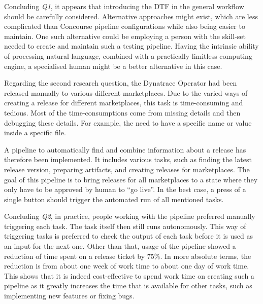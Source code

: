 Concluding \textit{Q1}, it appears that introducing the DTF in the general workflow should be carefully considered.
Alternative approaches might exist, which are less complicated than Concourse pipeline configurations while also being easier to maintain.
One such alternative could be employing a person with the skill-set needed to create and maintain such a testing pipeline.
Having the intrinsic ability of processing natural language, combined with a practically limitless computing engine, a specialised human might be a better alternative in this case.

Regarding the second research question, the Dynatrace Operator had been released manually to various different marketplaces.
Due to the varied ways of creating a release for different marketplaces, this task is time-consuming and tedious.
Most of the time-consumptions come from missing details and then debugging these details.
For example, the need to have a specific name or value inside a specific file.

A pipeline to automatically find and combine information about a release has therefore been implemented.
It includes various tasks, such as finding the latest release version, preparing artifacts, and creating releases for marketplaces.
The goal of this pipeline is to bring releases for all marketplaces to a state where they only have to be approved by human to ``go live''.
In the best case, a press of a single button should trigger the automated run of all mentioned tasks.

Concluding \textit{Q2}, in practice, people working with the pipeline preferred manually triggering each task.
The task itself then still runs autonomously.
This way of triggering tasks is preferred to check the output of each task before it is used as an input for the next one.
Other than that, usage of the pipeline showed a reduction of time spent on a release ticket by $75 \%$.
In more absolute terms, the reduction is from about one week of work time to about one day of work time.
This shows that it is indeed cost-effective to spend work time on creating such a pipeline as it greatly increases the time that is available for other tasks, such as implementing new features or fixing bugs.
